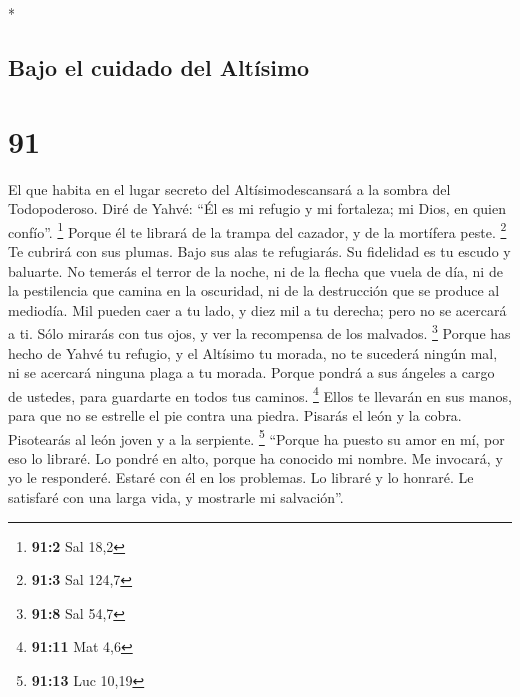 \begin{paracol}{2}
\begin{otherlanguage}{english}
\end{otherlanguage}

\switchcolumn[0]*

\hypertarget{bajo-el-cuidado-del-altuxedsimo}{%
\subsection{Bajo el cuidado del
Altísimo}\label{bajo-el-cuidado-del-altuxedsimo}}

\hypertarget{section-180}{%
\section{91}\label{section-180}}

 El que habita en el lugar secreto del Altísimodescansará
a la sombra del Todopoderoso.  Diré de Yahvé: ``Él es mi
refugio y mi fortaleza; mi Dios, en quien confío''. \footnote{\textbf{91:2}
  Sal 18,2}  Porque él te librará de la trampa del
cazador, y de la mortífera peste. \footnote{\textbf{91:3} Sal 124,7}
 Te cubrirá con sus plumas. Bajo sus alas te refugiarás.
Su fidelidad es tu escudo y baluarte.  No temerás el
terror de la noche, ni de la flecha que vuela de día,  ni
de la pestilencia que camina en la oscuridad, ni de la destrucción que
se produce al mediodía.  Mil pueden caer a tu lado, y diez
mil a tu derecha; pero no se acercará a ti.  Sólo mirarás
con tus ojos, y ver la recompensa de los malvados. \footnote{\textbf{91:8}
  Sal 54,7}  Porque has hecho de Yahvé tu refugio, y el
Altísimo tu morada,  no te sucederá ningún mal, ni se
acercará ninguna plaga a tu morada.  Porque pondrá a sus
ángeles a cargo de ustedes, para guardarte en todos tus caminos.
\footnote{\textbf{91:11} Mat 4,6}  Ellos te llevarán en
sus manos, para que no se estrelle el pie contra una piedra.
 Pisarás el león y la cobra. Pisotearás al león joven y a
la serpiente. \footnote{\textbf{91:13} Luc 10,19} 
``Porque ha puesto su amor en mí, por eso lo libraré. Lo pondré en alto,
porque ha conocido mi nombre.  Me invocará, y yo le
responderé. Estaré con él en los problemas. Lo libraré y lo honraré.
 Le satisfaré con una larga vida, y mostrarle mi
salvación''.

\switchcolumn
\begin{otherlanguage}{english}


\end{otherlanguage}
\end{paracol}
